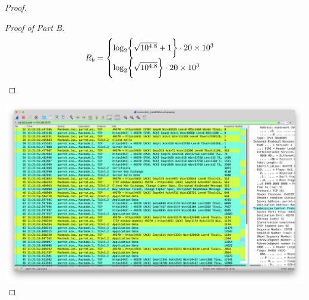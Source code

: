 \documentclass[../../main.tex]{subfiles}
\begin{document}
\begin{proof}
\begin{proof}[Proof of Part B]
    \[R_b=\begin{cases}\log_2\biggl\{\sqrt{10^{4.8}}+1\biggr\}\cdot 20\times 10^{3}\\
    \log_2\biggl\{\sqrt{10^{4.8}}\biggr\}\cdot 20\times 10^{3}\end{cases}\]
\end{proof}
\includegraphics[width=\textwidth]{subfiles/images/L4N1_PAGE15_LIST_OF_PACKETS_1.png}
\end{proof}
\end{document}
